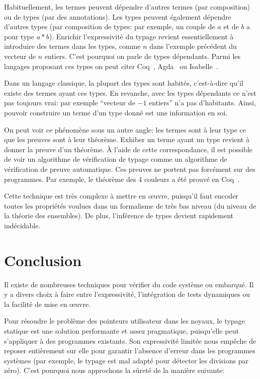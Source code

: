 Habituellement, les termes peuvent dépendre d'autres termes (par composition) ou
de types (par des annotations). Les types peuvent également dépendre d'autres
types (par composition de types: par exemple, un couple de $a$ et de $b$ a pour
type $a * b$). Enrichir l'expressivité du typage revient essentiellement à
introduire des termes dans les types, comme $n$ dans l'exemple précédent du
vecteur de $n$ entiers. C'est pourquoi on parle de types dépendants. Parmi les
langages proposant ces types on peut citer Coq~\cite{coqmanual},
Agda~\cite{agdatutorial} ou Isabelle~\cite{isabelletutorial}.

Dans un langage classique, la plupart des types sont habités, c'est-à-dire qu'il
existe des termes ayant ces types. En revanche, avec les types dépendants ce
n'est pas toujours vrai: par exemple \enquote{vecteur de $-1$ entiers} n'a pas
d'habitants. Ainsi, pouvoir construire un terme d'un type donné est une
information en soi.

On peut voir ce phénomène sous un autre angle: les termes sont à leur type ce
que les preuves sont à leur théorème. Exhiber un terme ayant un type revient à
donner la preuve d'un théorème. À l'aide de cette correspondance, il est
possible de voir un algorithme de vérification de typage comme un algorithme de
vérification de preuve automatique. Ces preuves ne portent pas forcément sur des
programmes. Par exemple, le théorème des 4 couleurs a été prouvé en
Coq~\cite{4colpap}.

Cette technique est très complexe à mettre en œuvre, puisqu'il faut encoder
toutes les propriétés voulues dans un formalisme de très bas niveau (du niveau
de la théorie des ensembles). De plus, l'inférence de types devient rapidement
indécidable.

\section*{Conclusion}

Il existe de nombreuses techniques pour vérifier du code système ou embarqué. Il
y a divers choix à faire entre l'expressivité, l'intégration de tests
dynamiques ou la facilité de mise en œuvre.

Pour résoudre le problème des pointeurs utilisateur dans les noyaux, le typage
statique est une solution performante et assez pragmatique, puisqu'elle peut
s'appliquer à des programmes existants. Son expressivité limitée nous empêche de
reposer entièrement sur elle pour garantir l'absence d'erreur dans les
programmes systèmes (par exemple, le typage est mal adapté pour détecter les
divisions par zéro). C'est pourquoi nous approchons la sûreté de la manière
suivante:

